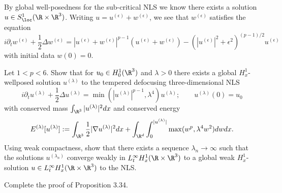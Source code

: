 \begin{solution}
	By global well-posedness for the sub-critical NLS we know there exists a solution $u \in S^1_{\loc} (\R \times \R^3)$. Writing $u = u^{(\epsilon)} + w^{(\epsilon)}$, we see that $w^{(\epsilon)}$ satisfies the equation 
		\[ i \partial_t w^{(\epsilon)} + \frac12 \Delta w^{(\epsilon)} = |u^{(\epsilon)} + w^{(\epsilon)}|^{p - 1} (u^{(\epsilon)} + w^{(\epsilon)}) -  (|u^{(\epsilon)}|^2 + \epsilon^2)^{(p - 1)/2} u^{(\epsilon)} \]
	with initial data $w(0) = 0$.  
\end{solution}

\begin{statement}
	Let $1 < p < 6$. Show that for $u_0 \in H^1_0 (\R^3)$ and $\lambda > 0$ there exists a global $H^1_x$-wellposed solution $u^{(\lambda)}$ to the tempered defocusing three-dimensional NLS
		\[ i \partial_t u^{(\lambda)} + \frac12 \Delta u^{(\lambda)} = \min (|u^{(\lambda)}|^{p - 1}, \lambda^4) u^{(\lambda)}; \qquad u^{(\lambda)} (0) = u_0\]
	with conserved mass $\int_{\R^3} |u^{(\lambda)}|^2 dx$ and conserved energy
		\[ E^{(\lambda)} [u^{(\lambda)}] := \int_{\R^3} \frac12 |\nabla u^{(\lambda)}|^2 dx + \int_{\R^d} \int_0^{|u^{(\lambda)}|} \max (w^p, \lambda^4 w^2) dw dx.\]
	Using weak compactness, show that there exists a sequence $\lambda_n \to \infty$ such that the solutions $u^{(\lambda_n)}$ converge weakly in $L^\infty_t H^1_x (\R \times \R^3)$ to a global weak $H^1_x$-solution $u \in L^\infty_t H^1_x (\R \times \R^3)$ to the NLS. 	
\end{statement}

\begin{solution}
	
\end{solution}

\begin{statement}
	Complete the proof of Proposition 3.34. 
\end{statement}

